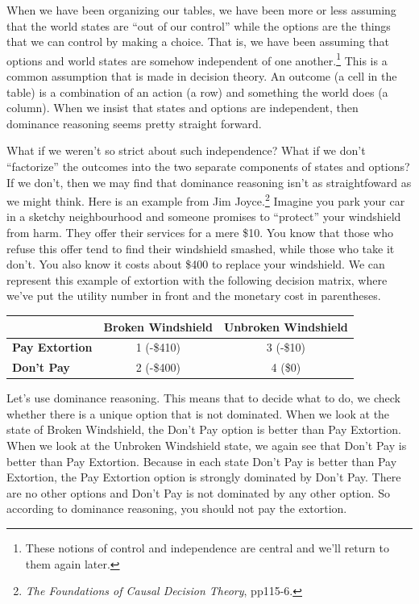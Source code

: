 \documentclass[]{tufte-book}
\begin{document}
When we have been organizing our tables, we have been more or less assuming that the world states are ``out of our control'' while the options are the things that we can control by making a choice. That is, we have been assuming that options and world states are somehow independent of one another.\footnote{These notions of control and independence are central and we'll return to them again later.} This is a common assumption that is made in decision theory. An outcome (a cell in the table) is a combination of an action (a row) and something the world does (a column). When we insist that states and options are independent, then dominance reasoning seems pretty straight forward.

What if we weren't so strict about such independence? What if we don't ``factorize'' the outcomes into the two separate components of states and options? If we don't, then we may find that dominance reasoning isn't as straightfoward as we might think. Here is an example from Jim Joyce.\footnote{\emph{The Foundations of Causal Decision Theory}, pp115-6.} Imagine you park your car in a sketchy neighbourhood and someone promises to ``protect'' your windshield from harm. They offer their services for a mere \$10. You know that those who refuse this offer tend to find their windshield smashed, while those who take it don't. You also know it costs about \$400 to replace your windshield. We can represent this example of extortion with the following decision matrix, where we've put the utility number in front and the monetary cost in parentheses.

\begin{longtable}[]{@{}lcc@{}}
\toprule
& Broken Windshield & Unbroken Windshield\tabularnewline
\midrule
\endhead
\textbf{Pay Extortion} & 1 (-\$410) & 3 (-\$10)\tabularnewline
\textbf{Don't Pay} & 2 (-\$400) & 4 (\$0)\tabularnewline
\bottomrule
\end{longtable}

Let's use dominance reasoning. This means that to decide what to do, we check whether there is a unique option that is not dominated. When we look at the state of Broken Windshield, the Don't Pay option is better than Pay Extortion. When we look at the Unbroken Windshield state, we again see that Don't Pay is better than Pay Extortion. Because in each state Don't Pay is better than Pay Extortion, the Pay Extortion option is strongly dominated by Don't Pay. There are no other options and Don't Pay is not dominated by any other option. So according to dominance reasoning, you should not pay the extortion.
\end{document}
